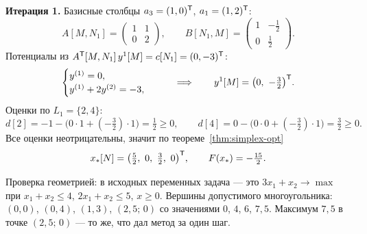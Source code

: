 \begin{example}
\medskip
\noindent\textbf{Итерация 1.} Базисные столбцы $a_3 = (1,0)^{\mathsf{T}}$, $a_1 = (1,2)^{\mathsf{T}}$:
\[
  A[M,N_1] = \begin{pmatrix} 1 & 1 \\ 0 & 2 \end{pmatrix} ,
  \qquad
  B[N_1,M] = \begin{pmatrix} 1 & -\tfrac12 \\[2pt] 0 & \tfrac12 \end{pmatrix} .
\]
Потенциалы из $A^{\mathsf{T}}[M,N_1]\,y^1[M] = c[N_1] = (0, -3)^{\mathsf{T}}$:
\[
  \begin{cases}
    y^{(1)} = 0 , \\
    y^{(1)} + 2 y^{(2)} = -3 ,
  \end{cases}
  \qquad\Longrightarrow\qquad
  y^1[M] = \big(0,\ -\tfrac32\big)^{\mathsf{T}} .
\]
Оценки по $L_1 = \{2,4\}$:
\[
  d[2] = -1 - \big(0\cdot 1 + (-\tfrac32)\cdot 1\big) = \tfrac12 \ge 0 ,
  \qquad
  d[4] = 0 - \big(0\cdot 0 + (-\tfrac32)\cdot 1\big) = \tfrac32 \ge 0 .
\]
Все оценки неотрицательны, значит по теореме~\ref{thm:simplex-opt}
\[
  x_*[N] = \big(\tfrac52,\ 0,\ \tfrac32,\ 0\big)^{\mathsf{T}} ,
  \qquad F(x_*) = -\tfrac{15}{2} .
\]
\end{example}

\begin{idea}
Проверка геометрией: в исходных переменных задача — это
$3x_1 + x_2 \to \max$ при $x_1 + x_2 \le 4$, $2x_1 + x_2 \le 5$, $x \ge 0$.
Вершины допустимого многоугольника: $(0,0)$, $(0,4)$, $(1,3)$, $(2{,}5;\,0)$ со
значениями $0$, $4$, $6$, $7{,}5$. Максимум $7{,}5$ в точке $(2{,}5;\,0)$ — то
же, что дал метод за один шаг.
\end{idea}

